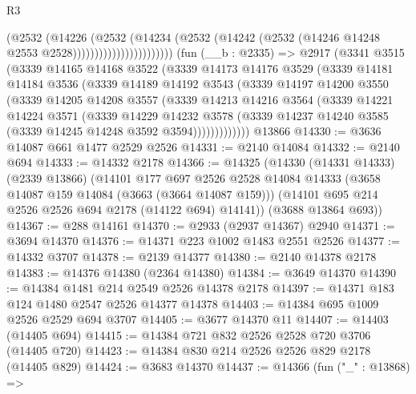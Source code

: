 \begin{lexlean}{R3}
\begin{coremodule}
                                  (@2532
                                    (@14226
                                      (@2532
                                        (@14234
                                          (@2532
                                            (@14242
                                              (@2532
                                                (@14246 @14248 @2553 @2528)))))))))))))))))))))))
    (fun (__b : @2335) =>
    @2917
      (@3341
        @3515
        (@3339
          @14165
          @14168
          @3522
          (@3339
            @14173
            @14176
            @3529
            (@3339
              @14181
              @14184
              @3536
              (@3339
                @14189
                @14192
                @3543
                (@3339
                  @14197
                  @14200
                  @3550
                  (@3339
                    @14205
                    @14208
                    @3557
                    (@3339
                      @14213
                      @14216
                      @3564
                      (@3339
                        @14221
                        @14224
                        @3571
                        (@3339
                          @14229
                          @14232
                          @3578
                          (@3339 @14237 @14240 @3585 (@3339 @14245 @14248 @3592 @3594)))))))))))))
    @13866
@14330 := @3636 @14087 @661 @1477 @2529 @2526
@14331 := @2140 @14084
@14332 := @2140 @694
@14333 := @14332 @2178
@14366 := @14325
    (@14330
      (@14331 @14333)
      (@2339 @13866)
      (@14101
        @177
        @697
        @2526
        @2528
        @14084
        @14333
        (@3658 @14087 @159 @14084 (@3663 (@3664 @14087 @159)))
        (@14101 @695 @214 @2526 @2526 @694 @2178 (@14122 @694) @14141))
      (@3688 @13864 @693))
@14367 := @288 @14161
@14370 := @2933 (@2937 @14367) @2940
@14371 := @3694 @14370
@14376 := @14371 @223 @1002 @1483 @2551 @2526
@14377 := @14332 @3707
@14378 := @2139 @14377
@14380 := @2140 @14378 @2178
@14383 := @14376 @14380 (@2364 @14380)
@14384 := @3649 @14370
@14390 := @14384 @1481 @214 @2549 @2526 @14378 @2178
@14397 := @14371 @183 @124 @1480 @2547 @2526 @14377 @14378
@14403 := @14384 @695 @1009 @2526 @2529 @694 @3707
@14405 := @3677 @14370 @11
@14407 := @14403 (@14405 @694)
@14415 := @14384 @721 @832 @2526 @2528 @720 @3706 (@14405 @720)
@14423 := @14384 @830 @214 @2526 @2526 @829 @2178 (@14405 @829)
@14424 := @3683 @14370
@14437 := @14366
    (fun ("_" : @13868) =>

\end{coremodule}
\end{lexlean}

